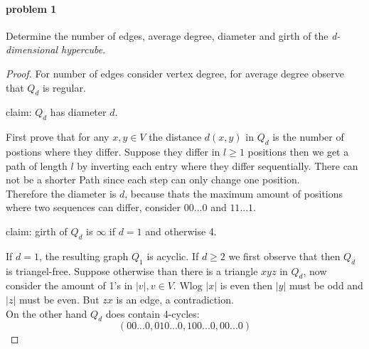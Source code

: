 \paragraph{problem 1}
Determine the number of edges, average degree, diameter and girth of the 
\textit{d-dimensional hypercube}.
\begin{proof}
    For number of edges consider vertex degree, for average degree observe that $ Q_d $ 
    is regular.

    \bigskip
    \noindent claim: $ Q_d $ has diameter $ d $.

    \smallskip
    \noindent First prove that for any $ x,y \in V $ the distance $ d(x,y) $ in $ Q_d $ is 
    the number of postions where they differ. Suppose they differ in $ l \geq 1 $ 
    positions then we get a path of length $ l $ by inverting each entry where they 
    differ sequentially. There can not be a shorter Path since each step 
    can only change one position. \\
    Therefore the diameter is $ d $, because thats the maximum amount of positions 
    where two sequences can differ, consider $ 00...0 $ and $ 11...1 $.

    \bigskip
    \noindent claim: girth of $ Q_d $ is $ \infty $ if $ d = 1 $ and otherwise 4.

    \smallskip
    \noindent
    If $ d = 1 $, the resulting graph $ Q_1 $ is acyclic. If $ d \geq 2 $ we first 
    observe that then $ Q_d $ is triangel-free. Suppose otherwise than there is 
    a triangle $ xyz $ in $ Q_d $, now consider the amount of 1's in $ |v|, v \in V $.
    Wlog $ |x| $ is even then $ |y| $ must be odd and $ |z| $ must be even.
    But $ zx $ is an edge, a contradiction. \\
    On the other hand $ Q_d $ does contain 4-cycles:
    $$ (00...0, 010...0, 100...0, 00...0)$$
\end{proof}

